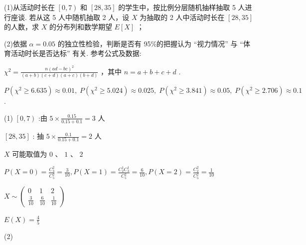 \documentclass[10pt]{article}
\newcommand*\circled[1]{\tikz[baseline=(char.base)]{\node[shape=circle,draw,inner sep=1.5pt] (char) {\small #1};}}
\begin{document}
(1)从活动时长在 \(\left\lbrack  {0,7}\right)\) 和 \(\left\lbrack  {{28},{35}}\right\rbrack\) 的学生中，按比例分层随机抽样抽取 5 人进行座谈. 若从这 5 人中随机抽取 2 人，设 \(X\) 为抽取的 2 人中活动时长在 \(\left\lbrack  {{28},{35}}\right\rbrack\) 的人数，求 \(X\) 的分布列和数学期望 \(E\left\lbrack  X\right\rbrack\) ；

(2)依据 \(\alpha  = {0.05}\) 的独立性检验，判断是否有 95\%的把握认为 “视力情况” 与 “体育活动时长是否达标” 有关. 参考公式及数据:

 \circled{1}  \({\chi }^{2} = \frac{n{\left( ad - bc\right) }^{2}}{\left( {a + b}\right) \left( {c + d}\right) \left( {a + c}\right) \left( {b + d}\right) }\) ，其中 \(n = a + b + c + d\) .

 \circled{2}  \(P\left( {{\chi }^{2} \geq  {6.635}}\right)  \approx  {0.01},\;P\left( {{\chi }^{2} \geq  {5.024}}\right)  \approx  {0.025},\;P\left( {{\chi }^{2} \geq  {3.841}}\right)  \approx  {0.05},\;P\left( {{\chi }^{2} \geq  {2.706}}\right)  \approx  {0.1}\) .

(1) \(\left\lbrack  {0,7}\right)\) :由 \(5 \times  \frac{0.15}{{0.15} + {0.1}} = 3\) 人

\(\left\lbrack  {{28},{35}}\right\rbrack\) : 抽 \(5 \times  \frac{0.1}{{0.15} + {0.1}} = 2\) 人

\(X\) 可能取值为 \(0\text{ 、 }1\text{ 、 }2\)

\(P\left( {X = 0}\right)  = \frac{{C}_{3}^{2}}{{C}_{5}^{2}} = \frac{3}{10},P\left( {X = 1}\right)  = \frac{{C}_{2}^{1}{C}_{3}^{1}}{{C}_{5}^{2}} = \frac{6}{10},P\left( {X = 2}\right)  = \frac{{C}_{2}^{2}}{{C}_{5}^{2}} = \frac{1}{10}\)

\(X \sim  \left( \begin{matrix} 0 & 1 & 2 \\  \frac{3}{10} & \frac{6}{10} & \frac{1}{10} \end{matrix}\right)\)

\(E\left( X\right)  = \frac{4}{5}\)

(2)

\begin{center}
\end{center}
\end{document}
